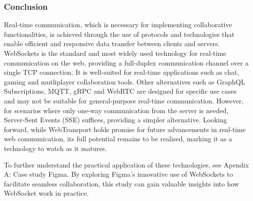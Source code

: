 \subsubsection{Conclusion}

Real-time communication, which is necessary for implementing collaborative functionalities, is achieved through the use of protocols and technologies that enable efficient and responsive data transfer between clients and servers. WebSockets is the standard and most widely used technology for real-time communication on the web, providing a full-duplex communication channel over a single TCP connection. It is well-suited for real-time applications such as chat, gaming and mutliplayer collaboration tools. Other alternatives such as GraphQL Subscriptions, MQTT, gRPC and WebRTC are designed for specific use cases and may not be suitable for general-purpose real-time communication. However, for scenarios where only one-way communication from the server is needed, Server-Sent Events (SSE) suffices, providing a simpler alternative. Looking forward, while WebTransport holds promise for future advancements in real-time web communication, its full potential remains to be realised, marking it as a technology to watch as it matures.

To further understand the practical application of these technologies, see Apendix A: Case study Figma. By exploring Figma's innovative use of WebSockets to facilitate seamless collaboration, this study can gain valuable insights into how WebSocket work in practice.
